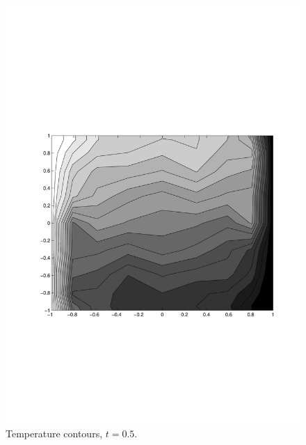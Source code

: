 \begin{multicols}{2}
\begin{figure}[H]
\centering
\includegraphics[scale=0.45, trim = 30mm 75mm 15mm 80mm,
clip]{./Figures/4-IVBP/temperature_t_5.pdf} \caption{Temperature contours, $t=0.5$.}
\end{figure}

\end{multicols}

\newpage

